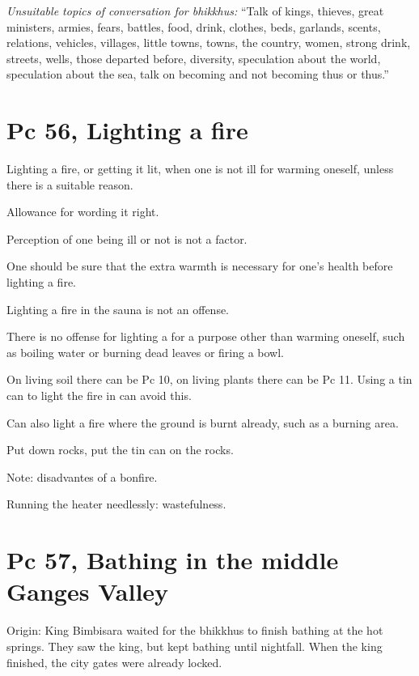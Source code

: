 \emph{Unsuitable topics of conversation for bhikkhus:} ``Talk of kings,
thieves, great ministers, armies, fears, battles, food, drink, clothes,
beds, garlands, scents, relations, vehicles, villages, little towns,
towns, the country, women, strong drink, streets, wells, those departed
before, diversity, speculation about the world, speculation about the
sea, talk on becoming and not becoming thus or thus.''

\section{Pc 56, Lighting a fire}

\begin{multicols}{2}

Lighting a fire, or getting it lit, when one is not ill for warming
oneself, unless there is a suitable reason.

Allowance for wording it right.

Perception of one being ill or not is not a factor.

One should be sure that the extra warmth is necessary for one's health
before lighting a fire.

Lighting a fire in the sauna is not an offense.

There is no offense for lighting a for a purpose other than warming
oneself, such as boiling water or burning dead leaves or firing a bowl.

On living soil there can be Pc 10, on living plants there can be Pc 11.
Using a tin can to light the fire in can avoid this.

Can also light a fire where the ground is burnt already, such as a
burning area.

Put down rocks, put the tin can on the rocks.

Note: disadvantes of a bonfire.

Running the heater needlessly: wastefulness.

\end{multicols}

\section{Pc 57, Bathing in the middle Ganges Valley}

Origin: King Bimbisara waited for the bhikkhus to finish bathing at the
hot springs. They saw the king, but kept bathing until nightfall. When
the king finished, the city gates were already locked.


